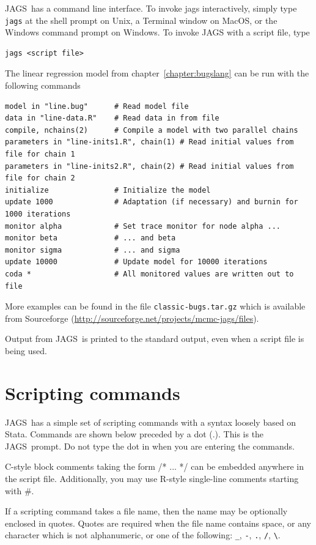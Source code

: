 \documentclass[11pt, a4paper, titlepage]{report}
\newcommand{\JAGS}{\textsf{JAGS}}
\newcommand{\R}{\textsf{R}}
\begin{document}
\JAGS\ has a command line interface. To invoke jags interactively,
simply type \texttt{jags} at the shell prompt on Unix, a Terminal
window on MacOS, or the Windows command prompt on Windows. To invoke
JAGS with a script file, type
\begin{verbatim}
jags <script file>
\end{verbatim}
The linear regression model from chapter~\ref{chapter:bugslang} can
be run with the following commands
\begin{verbatim}
model in "line.bug"      # Read model file
data in "line-data.R"    # Read data in from file
compile, nchains(2)      # Compile a model with two parallel chains
parameters in "line-inits1.R", chain(1) # Read initial values from file for chain 1
parameters in "line-inits2.R", chain(2) # Read initial values from file for chain 2
initialize               # Initialize the model
update 1000              # Adaptation (if necessary) and burnin for 1000 iterations
monitor alpha            # Set trace monitor for node alpha ...
monitor beta             # ... and beta
monitor sigma            # ... and sigma
update 10000             # Update model for 10000 iterations
coda *                   # All monitored values are written out to file
\end{verbatim}
More examples can be found in the file \verb+classic-bugs.tar.gz+
which is available from Sourceforge
(\url{http://sourceforge.net/projects/mcmc-jags/files}).

Output from \JAGS\ is printed to the standard output, even when a
script file is being used.  

\section{Scripting commands}
\label{section:scripting}

\JAGS\ has a simple set of scripting commands with a syntax loosely
based on \textsf{Stata}. Commands are shown below preceded by a dot
(.). This is the \JAGS\ prompt. Do not type the dot in when you are
entering the commands.

C-style block comments taking the form /* ... */ can be
embedded anywhere in the script file.  Additionally, you may use
\R-style single-line comments starting with \#.

If a scripting command takes a file name, then the name may be
optionally enclosed in quotes. Quotes are required when the file name
contains space, or any character which is not alphanumeric, or one of
the following: \verb+_+, \verb+-+, \verb+.+, \verb+/+, \verb+\+.
\end{document}
